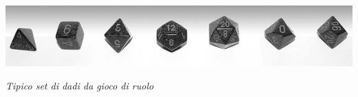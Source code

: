 

\vfill

\begin{center}
\includegraphics[keepaspectratio,width=0.95\linewidth]{immagini/dice.png}

\medskip

\emph{Tipico set di dadi da gioco di ruolo}
\end{center}

\pagebreak

